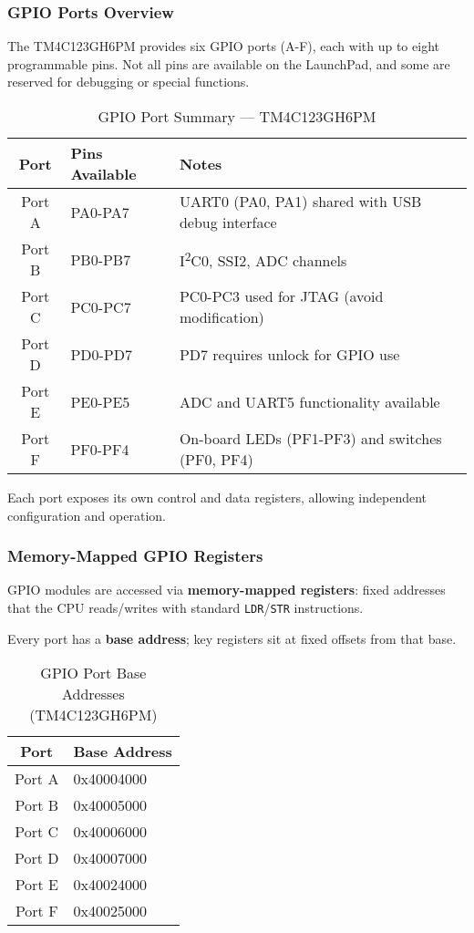 \subsubsection{GPIO Ports Overview}

The TM4C123GH6PM provides six GPIO ports (A-F), each with up to eight programmable pins. Not all pins are available on the LaunchPad, and some are reserved for debugging or special functions.

\begin{table}[H]
\centering
\small
\renewcommand{\arraystretch}{1.2}
\begin{tabular}{cll}
\toprule
\textbf{Port} & \textbf{Pins Available} & \textbf{Notes} \\
\midrule
Port A & PA0-PA7 & UART0 (PA0, PA1) shared with USB debug interface \\
Port B & PB0-PB7 & I\textsuperscript{2}C0, SSI2, ADC channels \\
Port C & PC0-PC7 & PC0-PC3 used for JTAG (avoid modification) \\
Port D & PD0-PD7 & PD7 requires unlock for GPIO use \\
Port E & PE0-PE5 & ADC and UART5 functionality available \\
Port F & PF0-PF4 & On-board LEDs (PF1-PF3) and switches (PF0, PF4) \\
\bottomrule
\end{tabular}
\caption{GPIO Port Summary — TM4C123GH6PM}
\end{table}

\noindent
Each port exposes its own control and data registers, allowing independent configuration and operation.
\bigskip

\subsubsection{Memory-Mapped GPIO Registers}

GPIO modules are accessed via \textbf{memory-mapped registers}: fixed addresses that the CPU reads/writes with standard \texttt{LDR}/\texttt{STR} instructions.

\noindent
Every port has a \textbf{base address}; key registers sit at fixed offsets from that base.

\begin{table}[H]
\centering
\small
\begin{tabular}{cl}
\toprule
\textbf{Port} & \textbf{Base Address} \\
\midrule
Port A & 0x40004000 \\
Port B & 0x40005000 \\
Port C & 0x40006000 \\
Port D & 0x40007000 \\
Port E & 0x40024000 \\
Port F & 0x40025000 \\
\bottomrule
\end{tabular}
\caption{GPIO Port Base Addresses (TM4C123GH6PM)}
\end{table}

